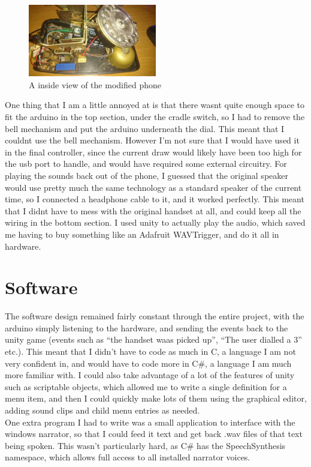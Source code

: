\documentclass[12pt]{article}
\begin{document}
\begin{figure}[h]
    \centering
    \includegraphics[width=0.5\textwidth]{PhoneInside}
    \caption{A inside view of the modified phone}
\end{figure}

One thing that I am a little annoyed at is that there wasnt quite enough space to fit the arduino in the top section, 
under the cradle switch, so I had to remove the bell mechanism and put the arduino underneath the dial. 
This meant that I couldnt use the bell mechanism. 
However I'm not sure that I would have used it in the final controller, 
since the current draw would likely have been too high for the usb port to handle, 
and would have required some external circuitry.
For playing the sounds back out of the phone, 
I guessed that the original speaker would use pretty much the same technology as a standard speaker of the current time, 
so I connected a headphone cable to it, and it worked perfectly. 
This meant that I didnt have to mess with the original handset at all, 
and could keep all the wiring in the bottom section. I used unity to actually play the audio, 
which saved me having to buy something like an Adafruit WAVTrigger, and do it all in hardware.

\FloatBarrier
\section{Software} %
The software design remained fairly constant through the entire project, 
with the arduino simply listening to the hardware, 
and sending the events back to the unity game (events such as ``the handset waas picked up'', 
``The user dialled a 3'' etc.). This meant that I didn't have to code as much in C, 
a language I am not very confident in, and would have to code more in C\#, 
a language I am much more familiar with. 
I could also take advantage of a lot of the features of unity such as scriptable objects, 
which allowed me to write a single definition for a menu item, 
and then I could quickly make lots of them using the graphical editor, 
adding sound clips and child menu entries as needed.\\
One extra program I had to write was a small application to interface with the windows narrator,
so that I could feed it text and get back .wav files of that text being spoken.
This wasn't particularly hard, as C\# has the SpeechSynthesis namespace,
which allows full access to all installed narrator voices.
\end{document}

